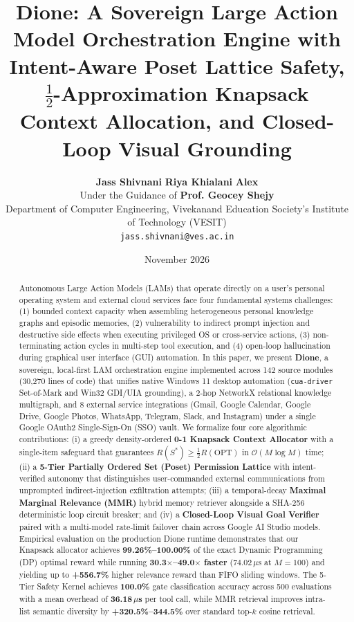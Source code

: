 \documentclass[10pt,a4paper]{article}
\title{\vspace{-10mm}\textbf{\Large\color{primary} Dione: A Sovereign Large Action Model Orchestration Engine with Intent-Aware Poset Lattice Safety, $\frac{1}{2}$-Approximation Knapsack Context Allocation, and Closed-Loop Visual Grounding}}
\author{
  \textbf{Jass Shivnani} \quad \textbf{Riya Khialani} \quad \textbf{Alex} \\
  \small Under the Guidance of \textbf{Prof. Geocey Shejy} \\
  \small Department of Computer Engineering, Vivekanand Education Society's Institute of Technology (VESIT) \\
  \small \texttt{jass.shivnani@ves.ac.in}
}
\date{\small November 2026}
\begin{document}
\maketitle
\thispagestyle{fancy}

\begin{abstract}
\noindent Autonomous Large Action Models (LAMs) that operate directly on a user's personal operating system and external cloud services face four fundamental systems challenges: (1) bounded context capacity when assembling heterogeneous personal knowledge graphs and episodic memories, (2) vulnerability to indirect prompt injection and destructive side effects when executing privileged OS or cross-service actions, (3) non-terminating action cycles in multi-step tool execution, and (4) open-loop hallucination during graphical user interface (GUI) automation. In this paper, we present \textbf{Dione}, a sovereign, local-first LAM orchestration engine implemented across 142 source modules (30,270 lines of code) that unifies native Windows 11 desktop automation (\texttt{cua-driver} Set-of-Mark and Win32 GDI/UIA grounding), a 2-hop NetworkX relational knowledge multigraph, and 8 external service integrations (Gmail, Google Calendar, Google Drive, Google Photos, WhatsApp, Telegram, Slack, and Instagram) under a single Google OAuth2 Single-Sign-On (SSO) vault. We formalize four core algorithmic contributions: (i) a greedy density-ordered \textbf{0-1 Knapsack Context Allocator} with a single-item safeguard that guarantees $R(S^*) \ge \frac{1}{2} R(\text{OPT})$ in $\mathcal{O}(M \log M)$ time; (ii) a \textbf{5-Tier Partially Ordered Set (Poset) Permission Lattice} with intent-verified autonomy that distinguishes user-commanded external communications from unprompted indirect-injection exfiltration attempts; (iii) a temporal-decay \textbf{Maximal Marginal Relevance (MMR)} hybrid memory retriever alongside a SHA-256 deterministic loop circuit breaker; and (iv) a \textbf{Closed-Loop Visual Goal Verifier} paired with a multi-model rate-limit failover chain across Google AI Studio models. Empirical evaluation on the production Dione runtime demonstrates that our Knapsack allocator achieves \textbf{99.26\%--100.00\%} of the exact Dynamic Programming (DP) optimal reward while running \textbf{30.3$\times$--49.0$\times$ faster} ($74.02\,\mu\text{s}$ at $M=100$) and yielding up to \textbf{+556.7\%} higher relevance reward than FIFO sliding windows. The 5-Tier Safety Kernel achieves \textbf{100.0\%} gate classification accuracy across 500 evaluations with a mean overhead of \textbf{36.18\,$\mu$s} per tool call, while MMR retrieval improves intra-list semantic diversity by \textbf{+320.5\%--344.5\%} over standard top-$k$ cosine retrieval.
\end{abstract}
\end{document}
